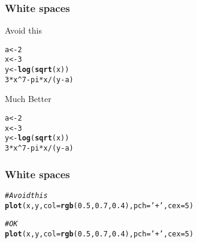 \documentclass[12pt]{beamer}\usepackage[]{graphicx}\usepackage[]{color}
\makeatletter
\newcommand{\hlnum}[1]{\textcolor[rgb]{0.686,0.059,0.569}{#1}}%
\newcommand{\hlstr}[1]{\textcolor[rgb]{0.192,0.494,0.8}{#1}}%
\newcommand{\hlcom}[1]{\textcolor[rgb]{0.678,0.584,0.686}{\textit{#1}}}%
\newcommand{\hlopt}[1]{\textcolor[rgb]{0,0,0}{#1}}%
\newcommand{\hlstd}[1]{\textcolor[rgb]{0.345,0.345,0.345}{#1}}%
\newcommand{\hlkwb}[1]{\textcolor[rgb]{0.69,0.353,0.396}{#1}}%
\newcommand{\hlkwc}[1]{\textcolor[rgb]{0.333,0.667,0.333}{#1}}%
\newcommand{\hlkwd}[1]{\textcolor[rgb]{0.737,0.353,0.396}{\textbf{#1}}}%
\newenvironment{kframe}{%
 \def\at@end@of@kframe{}%
 \ifinner\ifhmode%
  \def\at@end@of@kframe{\end{minipage}}%
  \begin{minipage}{\columnwidth}%
 \fi\fi%
 \def\FrameCommand##1{\hskip\@totalleftmargin \hskip-\fboxsep
 \colorbox{shadecolor}{##1}\hskip-\fboxsep
     \hskip-\linewidth \hskip-\@totalleftmargin \hskip\columnwidth}%
 \MakeFramed {\advance\hsize-\width
   \@totalleftmargin\z@ \linewidth\hsize
   \@setminipage}}%
 {\par\unskip\endMakeFramed%
 \at@end@of@kframe}
\newenvironment{knitrout}{}{} %
\makeatother
\begin{document}

\begin{frame}[fragile]
\frametitle{White spaces}

Avoid this
\begin{knitrout}\footnotesize
{}\color{fgcolor}\begin{kframe}
\begin{alltt}
\hlstd{a}\hlkwb{<-}\hlnum{2}
\hlstd{x}\hlkwb{<-}\hlnum{3}
\hlstd{y}\hlkwb{<-}\hlkwd{log}\hlstd{(}\hlkwd{sqrt}\hlstd{(x))}
\hlnum{3}\hlopt{*}\hlstd{x}\hlopt{^}\hlnum{7}\hlopt{-}\hlstd{pi}\hlopt{*}\hlstd{x}\hlopt{/}\hlstd{(y}\hlopt{-}\hlstd{a)}
\end{alltt}
\end{kframe}
\end{knitrout}

Much Better
\begin{knitrout}\footnotesize
{}\color{fgcolor}\begin{kframe}
\begin{alltt}
\hlstd{a} \hlkwb{<-} \hlnum{2}
\hlstd{x} \hlkwb{<-} \hlnum{3}
\hlstd{y} \hlkwb{<-} \hlkwd{log}\hlstd{(}\hlkwd{sqrt}\hlstd{(x))}
\hlnum{3}\hlopt{*}\hlstd{x}\hlopt{^}\hlnum{7} \hlopt{-} \hlstd{pi} \hlopt{*} \hlstd{x} \hlopt{/} \hlstd{(y} \hlopt{-} \hlstd{a)}
\end{alltt}
\end{kframe}
\end{knitrout}

\end{frame}


\begin{frame}[fragile]
\frametitle{White spaces}

\begin{knitrout}\footnotesize
{}\color{fgcolor}\begin{kframe}
\begin{alltt}
\hlcom{# Avoid this}
\hlkwd{plot}\hlstd{(x,y,}\hlkwc{col}\hlstd{=}\hlkwd{rgb}\hlstd{(}\hlnum{0.5}\hlstd{,}\hlnum{0.7}\hlstd{,}\hlnum{0.4}\hlstd{),}\hlkwc{pch}\hlstd{=}\hlstr{'+'}\hlstd{,}\hlkwc{cex}\hlstd{=}\hlnum{5}\hlstd{)}
\end{alltt}
\end{kframe}
\end{knitrout}

\pause
\begin{knitrout}\footnotesize
{}\color{fgcolor}\begin{kframe}
\begin{alltt}
\hlcom{# OK}
\hlkwd{plot}\hlstd{(x, y,} \hlkwc{col} \hlstd{=} \hlkwd{rgb}\hlstd{(}\hlnum{0.5}\hlstd{,} \hlnum{0.7}\hlstd{,} \hlnum{0.4}\hlstd{),} \hlkwc{pch} \hlstd{=} \hlstr{'+'}\hlstd{,} \hlkwc{cex} \hlstd{=} \hlnum{5}\hlstd{)}
\end{alltt}
\end{kframe}
\end{knitrout}

\end{frame}
\end{document}
